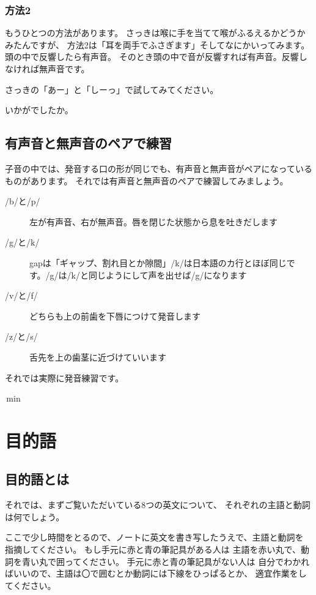 \documentclass[book,jafontscale=0.9247]{jlreq}
\begin{document}
\subsection{方法2}
もうひとつの方法があります。
さっきは喉に手を当てて喉がふるえるかどうかみたんですが、
方法2は「耳を両手でふさぎます」そしてなにかいってみます。
頭の中で反響したら有声音。
そのとき頭の中で音が反響すれば有声音。反響しなければ無声音です。

さっきの「あー」と「しーっ」で試してみてください。

いかがでしたか。





\section{有声音と無声音のペアで練習}
子音の中では、発音する口の形が同じでも、有声音と無声音がペアになっているものがあります。
それでは有声音と無声音のペアで練習してみましょう。

\begin{description}
 \item[/b/と/p/] 左が有声音、右が無声音。唇を閉じた状態から息を吐きだします
 \item[/g/と/k/] gapは「ギャップ、割れ目とか隙間」/k/は日本語のカ行とほぼ同じです。/g/は/k/と同じようにして声を出せば/g/になります
 \item[/v/と/f/] どちらも上の前歯を下唇につけて発音します
 \item[/z/と/s/] 舌先を上の歯茎に近づけていいます
\end{description}

それでは実際に発音練習です。

\,min

\chapter{目的語}
\section{目的語とは}
それでは、まずご覧いただいている8つの英文について、
それぞれの主語と動詞は何でしょう。

ここで少し時間をとるので、ノートに英文を書き写したうえで、主語と動詞を
指摘してください。
もし手元に赤と青の筆記具がある人は
主語を赤い丸で、動詞を青い丸で囲ってください。
手元に赤と青の筆記具がない人は
自分でわかればいいので、主語は〇で囲むとか動詞には下線をひっぱるとか、
適宜作業をしてください。
\end{document}
